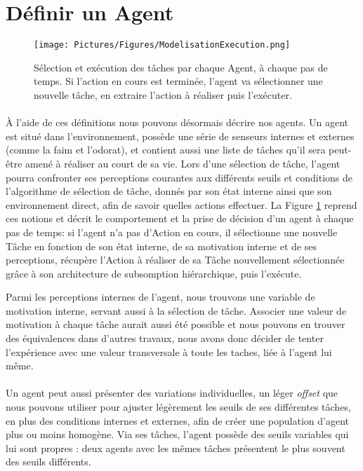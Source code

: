 	\section{Définir un Agent}
	
	\begin{figure}
	\centering
	\texttt{[image: Pictures/Figures/ModelisationExecution.png]}
	\caption[Sélection et exécution des tâches par chaque Agent, à chaque pas de temps.]{Sélection et exécution des tâches par chaque Agent, à chaque pas de temps. Si l'action en cours est terminée, l'agent va sélectionner une nouvelle tâche, en extraire l'action à réaliser puis l'exécuter.}
	\label{agentExec}
	\end{figure}		
	
		\paragraph{}
		À l'aide de ces définitions nous pouvons désormais décrire nos agents. Un agent est situé dans l'environnement, possède une série de senseurs internes et externes (comme la faim et l'odorat), et contient aussi une liste de tâches qu'il sera peut-être amené à réaliser au court de sa vie. Lors d'une sélection de tâche, l'agent pourra confronter ses perceptions courantes aux différents seuils et conditions de l'algorithme de sélection de tâche, donnés par son état interne ainsi que son environnement direct, afin de savoir quelles actions effectuer. La Figure \ref{agentExec} reprend ces notions et décrit le comportement et la prise de décision d'un agent à chaque pas de temps: si l'agent n'a pas d'Action en cours, il sélectionne une nouvelle Tâche en fonction de son état interne, de sa motivation interne et de ses perceptions, récupère l'Action à réaliser de sa Tâche nouvellement sélectionnée grâce à son architecture de subsomption hiérarchique, puis l'exécute.
		
		Parmi les perceptions internes de l'agent, nous trouvons une variable de motivation interne, servant aussi à la sélection de tâche. Associer une valeur de motivation à chaque tâche aurait aussi été possible et nous pouvons en trouver des équivalences dans d'autres travaux\cite{agassounon_scalable_2001}, nous avons donc décider de tenter l'expérience avec une valeur transversale à toute les taches, liée à l'agent lui même.
		
		\paragraph{}
		Un agent peut aussi présenter des variations individuelles, un léger \textit{offset} que nous pouvons utiliser pour ajuster légèrement les seuils de ses différentes tâches, en plus des conditions internes et externes, afin de créer une population d'agent plus ou moins homogène. Via ses tâches, l'agent possède des seuils variables qui lui sont propres : deux agents avec les mêmes tâches présentent le plus souvent des seuils différents.
		
